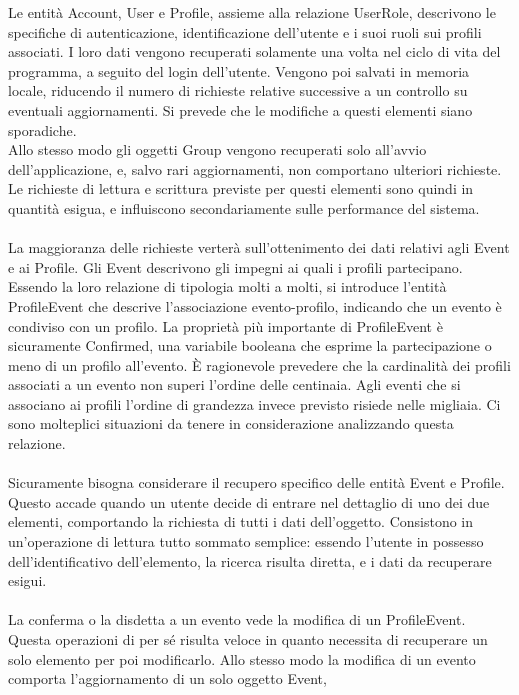 \clearpage
Le entità Account, User e Profile, assieme alla relazione UserRole,
descrivono le specifiche di autenticazione, identificazione dell'utente e i suoi ruoli sui profili associati.
I loro dati vengono recuperati solamente una volta nel ciclo di vita del programma,
a seguito del login dell'utente.
Vengono poi salvati in memoria locale,
riducendo il numero di richieste relative successive a un controllo su eventuali aggiornamenti.
Si prevede che le modifiche a questi elementi siano sporadiche.\\
Allo stesso modo gli oggetti Group vengono recuperati solo all'avvio dell'applicazione, e,
salvo rari aggiornamenti, non comportano ulteriori richieste.
Le richieste di lettura e scrittura previste per questi elementi sono quindi in quantità esigua,
e influiscono secondariamente sulle performance del sistema.\\
\\
La maggioranza delle richieste verterà sull'ottenimento dei dati relativi agli Event e ai Profile.
Gli Event descrivono gli impegni ai quali i profili partecipano.
Essendo la loro relazione di tipologia molti a molti,
si introduce l'entità ProfileEvent che descrive l'associazione evento-profilo,
indicando che un evento è condiviso con un profilo.
La proprietà più importante di ProfileEvent è sicuramente Confirmed,
una variabile booleana che esprime la partecipazione o meno di un profilo all'evento.
È ragionevole prevedere che la cardinalità dei profili associati a un evento non superi l'ordine delle centinaia.
Agli eventi che si associano ai profili l'ordine di grandezza invece previsto risiede nelle migliaia.
Ci sono molteplici situazioni da tenere in considerazione analizzando questa relazione.\\
\\
Sicuramente bisogna considerare il recupero specifico delle entità Event e Profile.
Questo accade quando un utente decide di entrare nel dettaglio di uno dei due elementi,
comportando la richiesta di tutti i dati dell'oggetto.
Consistono in un'operazione di lettura tutto sommato semplice:
essendo l'utente in possesso dell'identificativo dell'elemento,
la ricerca risulta diretta, e i dati da recuperare esigui.\\
\\
La conferma o la disdetta a un evento vede la modifica di un ProfileEvent.
Questa operazioni di per sé risulta veloce
in quanto necessita di recuperare un solo elemento per poi modificarlo.
Allo stesso modo la modifica di un evento comporta l'aggiornamento di un solo oggetto Event,
